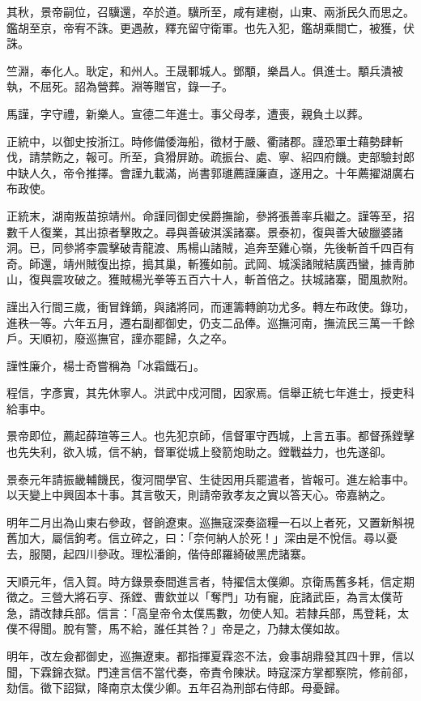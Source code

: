 \begin{pinyinscope}
其秋，景帝嗣位，召驥還，卒於道。驥所至，咸有建樹，山東、兩浙民久而思之。鑑胡至京，帝宥不誅。更遇赦，釋充留守衛軍。也先入犯，鑑胡乘間亡，被獲，伏誅。

竺淵，奉化人。耿定，和州人。王晟鄆城人。鄧顒，樂昌人。俱進士。顒兵潰被執，不屈死。詔為營葬。淵等贈官，錄一子。

馬謹，字守禮，新樂人。宣德二年進士。事父母孝，遭喪，親負土以葬。

正統中，以御史按浙江。時修備倭海船，徵材于嚴、衢諸郡。謹恐軍士藉勢肆斬伐，請禁飭之，報可。所至，貪猾屏跡。疏振台、處、寧、紹四府饑。吏部驗封郎中缺人久，帝令推擇。會謹九載滿，尚書郭璡薦謹廉直，遂用之。十年薦擢湖廣右布政使。

正統末，湖南叛苗掠靖州。命謹同御史侯爵撫諭，參將張善率兵繼之。謹等至，招數千人復業，其出掠者擊敗之。尋與善破淇溪諸寨。景泰初，復與善大破臘婆諸洞。已，同參將李震擊破青龍渡、馬楊山諸賊，追奔至雞心嶺，先後斬首千四百有奇。師還，靖州賊復出掠，搗其巢，斬獲如前。武岡、城溪諸賊結廣西蠻，據青肺山，復與震攻破之。獲賊楊光拳等五百六十人，斬首倍之。扶城諸寨，聞風款附。

謹出入行間三歲，衝冒鋒鏑，與諸將同，而運籌轉餉功尤多。轉左布政使。錄功，進秩一等。六年五月，遷右副都御史，仍支二品俸。巡撫河南，撫流民三萬一千餘戶。天順初，廢巡撫官，謹亦罷歸，久之卒。

謹性廉介，楊士奇嘗稱為「冰霜鐵石」。

程信，字彥實，其先休寧人。洪武中戍河間，因家焉。信舉正統七年進士，授吏科給事中。

景帝即位，薦起薛瑄等三人。也先犯京師，信督軍守西城，上言五事。都督孫鏜擊也先失利，欲入城，信不納，督軍從城上發箭炮助之。鏜戰益力，也先遂卻。

景泰元年請振畿輔饑民，復河間學官、生徒因用兵罷遣者，皆報可。進左給事中。以天變上中興固本十事。其言敬天，則請帝敦孝友之實以答天心。帝嘉納之。

明年二月出為山東右參政，督餉遼東。巡撫寇深奏盜糧一石以上者死，又置新斛視舊加大，屬信鉤考。信立碎之，曰：「奈何納人於死！」深由是不悅信。尋以憂去，服闋，起四川參政。理松潘餉，偕侍郎羅綺破黑虎諸寨。

天順元年，信入賀。時方錄景泰間進言者，特擢信太僕卿。京衛馬舊多耗，信定期徵之。三營大將石亨、孫鏜、曹欽並以「奪門」功有寵，庇諸武臣，為言太僕苛急，請改隸兵部。信言：「高皇帝令太僕馬數，勿使人知。若隸兵部，馬登耗，太僕不得聞。脫有警，馬不給，誰任其咎？」帝是之，乃隸太僕如故。

明年，改左僉都御史，巡撫遼東。都指揮夏霖恣不法，僉事胡鼎發其四十罪，信以聞，下霖錦衣獄。門達言信不當代奏，帝責令陳狀。時寇深方掌都察院，修前郤，劾信。徵下詔獄，降南京太僕少卿。五年召為刑部右侍郎。母憂歸。


\end{pinyinscope}
